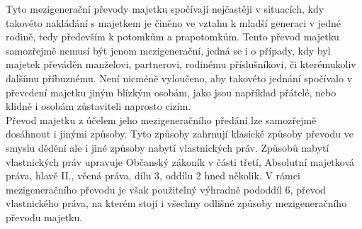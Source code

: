 \documentclass{article}
\begin{document}
Tyto mezigenerační převody majetku spočívají nejčastěji v situacích, kdy takovéto nakládání s majetkem je činěno ve vztahu k mladší generaci v jedné rodině, tedy především k potomkům a prapotomkům. %
Tento převod majetku samozřejmě nemusí být jenom mezigenerační, jedná se i o případy, kdy byl majetek převáděn manželovi, partnerovi, rodinému příslušníkovi, či kterémukoliv dalšímu příbuznému. Není nicméně vyloučeno, aby takovéto jednání spočívalo v převedení majetku jiným blízkým osobám, jako jsou například přátelé, nebo klidně i osobám zůstaviteli naprosto cizím.\\



Převod majetku z účelem jeho mezigeneračního předání lze samozřejmě dosáhnout i jinými způsoby. Tyto způsoby zahrnují klasické způsoby převodu ve smyslu dědění ale i jiné způsoby nabytí vlastnických práv. Způsobů nabytí vlastnických práv upravuje Občanský zákoník v části třetí, Absolutní majetková práva, hlavě II., věcná práva, dílu 3, oddílu 2 hned několik. V rámci mezigeneračního převodu je však použitelný výhradně pododdíl 6, převod vlastnického práva, na kterém stojí i všechny odlišné způsoby mezigeneračního převodu majetku.

\end{document}
